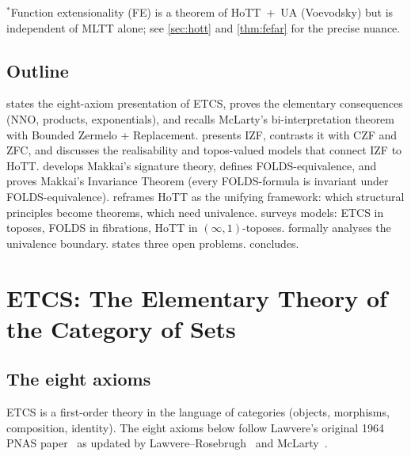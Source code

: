 \documentclass[12pt]{article}
\theoremstyle{definition}
\theoremstyle{remark}
\begin{document}
\noindent\(^{*}\)Function extensionality (FE) is a theorem of HoTT~+~UA (Voevodsky) but is
independent of MLTT alone; see \cref{sec:hott} and \cref{thm:fefar} for the precise
nuance.

\subsection{Outline}
 states the eight-axiom presentation of ETCS, proves the elementary
consequences (NNO, products, exponentials), and recalls McLarty's bi-interpretation
theorem with Bounded Zermelo + Replacement.
 presents IZF, contrasts it with CZF and ZFC, and discusses the
realisability and topos-valued models that connect IZF to HoTT.
 develops Makkai's signature theory, defines FOLDS-equivalence, and
proves Makkai's Invariance Theorem (every FOLDS-formula is invariant under FOLDS-equivalence).
 reframes HoTT as the unifying framework: which structural principles
become theorems, which need univalence.
 surveys models: ETCS in toposes, FOLDS in fibrations, HoTT in
$(\infty,1)$-toposes.
 formally analyses the univalence boundary.
 states three open problems.
 concludes.

\section{ETCS: The Elementary Theory of the Category of Sets}
\label{sec:etcs}

\subsection{The eight axioms}

ETCS is a first-order theory in the language of categories (objects, morphisms,
composition, identity). The eight axioms below follow Lawvere's original 1964 PNAS paper~\cite{Lawvere1964} as updated by Lawvere--Rosebrugh~\cite{LawvereRosebrugh2003} and
McLarty~\cite{McLarty2004}.
\end{document}
